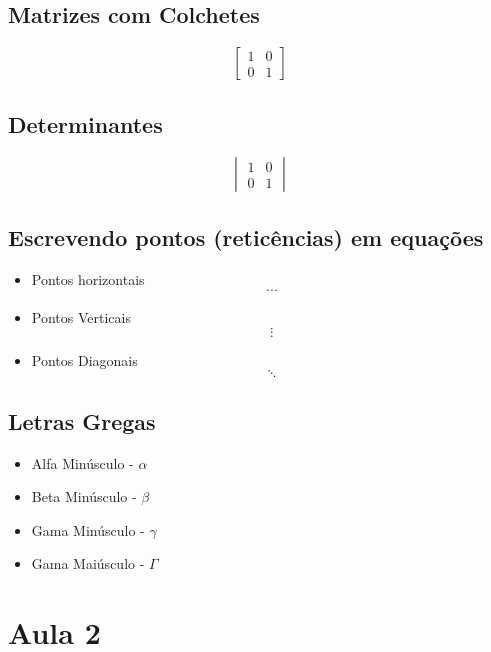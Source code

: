 \documentclass[12pt,a4paper]{article}
\begin{document}
\subsection{Matrizes com Colchetes}
\begin{equation}
    \begin{bmatrix}
    1 & 0 \\
    0 & 1
    \end{bmatrix}
\end{equation}
\subsection{Determinantes}
\begin{equation}
    \begin{vmatrix}
    1 & 0 \\
    0 & 1
    \end{vmatrix}
\end{equation}
\subsection{Escrevendo pontos (reticências) em equações}
\begin{itemize}
    \item Pontos horizontais 
    \begin{equation}
        \cdots
    \end{equation}
    \item Pontos Verticais
    \begin{equation}
        \vdots
    \end{equation}
    \item Pontos Diagonais
    \begin{equation}
        \ddots
    \end{equation}
\end{itemize}
\subsection{Letras Gregas}
\begin{itemize}
    \item Alfa Minúsculo - $\alpha$
    \item Beta Minúsculo - $\beta$ 
    \item Gama Minúsculo - $\gamma$
    \item Gama Maiúsculo - $\Gamma$
\end{itemize}
\section{Aula 2}
\end{document}

